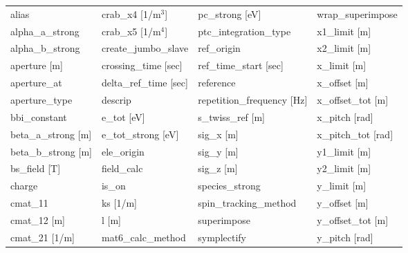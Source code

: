  \begin{tabular}{llll} \toprule
alias                            & crab_x4 [1/m$^3$]                & pc_strong [eV]                   & wrap_superimpose                 \\
alpha_a_strong                   & crab_x5 [1/m$^4$]                & ptc_integration_type             & x1_limit [m]                     \\
alpha_b_strong                   & create_jumbo_slave               & ref_origin                       & x2_limit [m]                     \\
aperture [m]                     & crossing_time [sec]              & ref_time_start [sec]             & x_limit [m]                      \\
aperture_at                      & delta_ref_time [sec]             & reference                        & x_offset [m]                     \\
aperture_type                    & descrip                          & repetition_frequency [Hz]        & x_offset_tot [m]                 \\
bbi_constant                     & e_tot [eV]                       & s_twiss_ref [m]                  & x_pitch [rad]                    \\
beta_a_strong [m]                & e_tot_strong [eV]                & sig_x [m]                        & x_pitch_tot [rad]                \\
beta_b_strong [m]                & ele_origin                       & sig_y [m]                        & y1_limit [m]                     \\
bs_field [T]                     & field_calc                       & sig_z [m]                        & y2_limit [m]                     \\
charge                           & is_on                            & species_strong                   & y_limit [m]                      \\
cmat_11                          & ks [1/m]                         & spin_tracking_method             & y_offset [m]                     \\
cmat_12 [m]                      & l [m]                            & superimpose                      & y_offset_tot [m]                 \\
cmat_21 [1/m]                    & mat6_calc_method                 & symplectify                      & y_pitch [rad]                    \\

\end{tabular}
